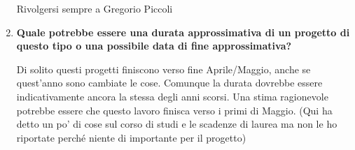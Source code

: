 \documentclass[11pt]{article}
\begin{document}
\begin{enumerate}
			\medskip
			
			Rivolgersi sempre a Gregorio Piccoli
			
			\bigskip
			
			\item \textbf{Quale potrebbe essere una durata approssimativa di un progetto di questo tipo o una possibile data di fine approssimativa? }
			
			\medskip
			
			Di solito questi progetti finiscono verso fine Aprile/Maggio, anche se quest'anno sono cambiate le cose. Comunque la durata dovrebbe essere indicativamente ancora la stessa degli anni scorsi. Una stima ragionevole potrebbe essere che questo lavoro finisca verso i primi di Maggio.
			(Qui ha detto un po' di cose sul corso di studi e le scadenze di laurea ma non le ho riportate perché niente di importante per il progetto)
			
		\end{enumerate}
	
\end{document}
